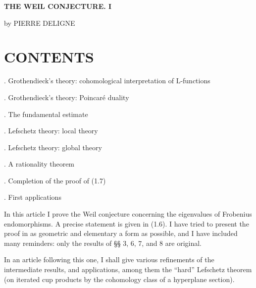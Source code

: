 \documentclass[10pt,leqno]{article}
\begin{document}
\begin{center}{\Large\bfseries THE WEIL CONJECTURE. I}\par\medskip by PIERRE DELIGNE\end{center}

\label{physical-2}\par\smallskip

\section*{CONTENTS}

. Grothendieck’s theory: cohomological interpretation of \(\mathrm{L}\)-functions\par

. Grothendieck’s theory: Poincaré duality\par

. The fundamental estimate\par

. Lefschetz theory: local theory\par

. Lefschetz theory: global theory\par

. A rationality theorem\par

. Completion of the proof of (1.7)\par

. First applications\par

\noindent In this article \(\mathrm{I}\) prove the Weil conjecture concerning the eigenvalues of Frobenius endomorphisms. \(\mathrm{A}\) precise statement is given in (1.6). I have tried to present the proof in as geometric and elementary a form as possible, and \(\mathrm{I}\) have included many reminders: only the results of §§ 3, 6, 7, and 8 are original.\par

\noindent In an article following this one, \(\mathrm{I}\) shall give various refinements of the intermediate results, and applications, among them the “hard” Lefschetz theorem (on iterated cup products by the cohomology class of a hyperplane section).\par
\end{document}
